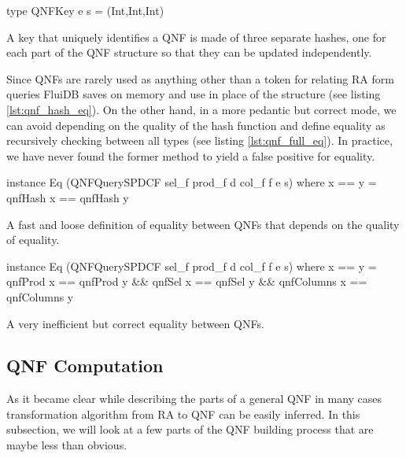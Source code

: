 \begin{code}
  \begin{haskellcode}
    type QNFKey e s = (Int,Int,Int)
  \end{haskellcode}
  \caption{\label{lst:qnf_key}A key that uniquely identifies a QNF is
    made of three separate hashes, one for each part of the QNF
    structure so that they can be updated independently.}
\end{code}

Since QNFs are rarely used as anything other than a token for relating
RA form queries FluiDB saves on memory and use  in place
of the  structure (see listing
\ref{lst:qnf_hash_eq}). On the other hand, in a more pedantic but
correct mode, we can avoid depending on the quality of the hash
function and define equality as recursively checking between all types
(see listing \ref{lst:qnf_full_eq}). In practice, we have never found the
former method to yield a false positive for equality.

\begin{code}
  \begin{haskellcode}
    instance Eq (QNFQuerySPDCF sel_f prod_f d col_f f e s) where
      x == y = qnfHash x == qnfHash y
  \end{haskellcode}
  \caption{\label{lst:qnf_hash_eq}A fast and loose definition of
    equality between QNFs that depends on the quality of equality.}
\end{code}

\begin{code}
  \begin{haskellcode}
    instance Eq (QNFQuerySPDCF sel_f prod_f d col_f f e s) where
      x == y = qnfProd x == qnfProd y
        && qnfSel x == qnfSel y
        && qnfColumns x == qnfColumns y
  \end{haskellcode}
  \caption{\label{lst:qnf_full_eq}A very inefficient but correct
    equality between QNFs.}
\end{code}

\subsection{QNF Computation}
\label{sec:building_qnfs}

As it became clear while describing the parts of a general QNF in many
cases transformation algorithm from RA to QNF can be easily
inferred. In this subsection, we will look at a few parts of the QNF
building process that are maybe less than obvious.

